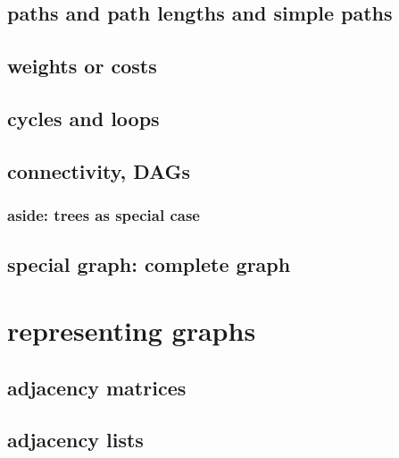 

\subsection{paths and path lengths and simple paths}



\subsection{weights or costs}



\subsection{cycles and loops}



\subsection{connectivity, DAGs}



\subsubsection{aside: trees as special case}



\subsection{special graph: complete graph}



\section{representing graphs}

\subsection{adjacency matrices}

\subsection{adjacency lists}

